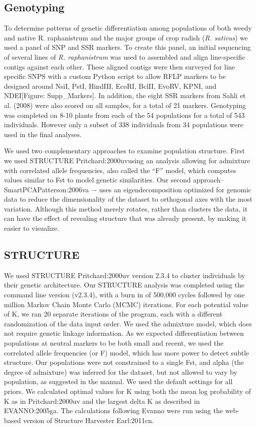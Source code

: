 \documentclass[twocolumn]{bmcart}%
\begin{document}
\subsection*{Genotyping}

To determine patterns of genetic differentiation among populations of both weedy and native R. raphanistrum and the major groups of crop radish (\textit{R. sativus}) we used a panel of SNP and SSR markers. To create this panel, an initial sequencing of several lines of \textit{R. raphanistrum} was used to assembled and align line-specific contigs against each other. These aligned contigs were then surveyed for line specific SNPS with a custom Python script to allow RFLP markers to be designed around NsiI, PstI, HindIII, EcoRI, BclII, EvoRV, KPNI, and NDEI[Figure: Supp\_Markers]. In addition, the eight SSR markers from Sahli et al. (2008) were also scored on all samples, for a total of 21 markers. Genotyping was completed on 8-10 plants from each of the 54 populations for a total of 543 individuals. However only a subset of 338 individuals from 34 populations were used in the final analyses.

We used two complementary approaches to examine population structure. First we used STRUCTURE {Pritchard:2000uv}using an analysis allowing for admixture with correlated allele frequencies, also called the “F” model, which computes values similar to Fst to model genetic similarities. Our second approach–SmartPCA{Patterson:2006va} –- uses an eigendecomposition optimized for genomic data to reduce the dimensionality of the dataset to orthogonal axes with the most variation. Although this method merely rotates, rather than clusters the data, it can have the effect of revealing structure that was already present, by making it easier to visualize.

\subsection*{STRUCTURE}

We used STRUCTURE {Pritchard:2000uv} version 2.3.4 to cluster individuals by their genetic architecture. Our STRUCTURE analysis was completed using the command line version (v2.3.4), with a burn in of 500,000 cycles followed by one million Markov Chain Monte Carlo (MCMC) iterations. For each potential value of K, we ran 20 separate iterations of the program, each with a different randomization of the data input order. We used the admixture model, which does not require genetic linkage information. As we expected differentiation between populations at neutral markers to be both small and recent, we used the correlated allele frequencies (or F) model, which has more power to detect subtle structure. Our populations were not constrained to a single Fst, and alpha (the degree of admixture) was inferred for the dataset, but not allowed to vary by population, as suggested in the manual. We used the default settings for all priors. We calculated optimal values for K using both the mean log probability of K as in {Pritchard:2000uv} and the largest delta K as described in {EVANNO:2005ga}. The calculations following Evanno were run using the web-based version of Structure Harvester {Earl:2011cn}.
\end{document}
